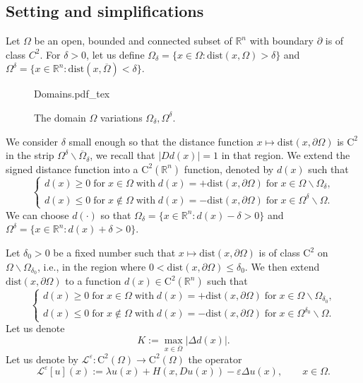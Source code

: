 \documentclass[11pt,reqno]{amsart}
\numberwithin{figure}{section}
\theoremstyle{plain}
\theoremstyle{remark}
\numberwithin{equation}{section}
\newcommand{\rmC}{\mathrm{C}}
\newcommand{\incfig}[1]{%
    \def\svgwidth{\columnwidth}
    {#1.pdf_tex}
}
\begin{document}
\subsection{Setting and simplifications} Let $\Omega$ be an open, bounded and connected subset of $\mathbb{R}^n$ with boundary $\partial$ is of class $C^2$. For $\delta>0$, let us define $\Omega_\delta = \{x\in \Omega: \mathrm{dist}(x,\Omega) > \delta\}$ and $\Omega^\delta = \{x\in \mathbb{R}^n: \mathrm{dist}(x,\overline{\Omega}) < \delta\}$. 
\begin{figure}[ht]
    \centering
    \def\svgwidth{0.47\columnwidth}
    {Domains.pdf_tex}
    \caption{The domain $\Omega$ variations $\Omega_\delta, \Omega^\delta$.}
    \label{fig:Domains}
\end{figure}
We consider $\delta$ small enough so that the distance function $x\mapsto \mathrm{dist}(x,\partial \Omega)$ is $\mathrm{C}^2$ in the strip $\Omega^\delta\backslash \overline{\Omega}_\delta$, we recall that $|D d(x)| = 1$ in that region. We extend the signed distance function into a $\mathrm{C}^2(\mathbb{R}^n)$ function, denoted by $d(x)$ such that 
\begin{equation*}
    \begin{cases}
    d(x)\geq 0\;\text{for}\;x\in\Omega\;\text{with}\;d(x) = +\mathrm{dist}(x,\partial\Omega)\;\text{for}\;x\in \Omega\backslash \Omega_\delta,\\
    d(x)\leq 0\;\text{for}\;x\notin \Omega\;\text{with}\;d(x) = -\mathrm{dist}(x,\partial\Omega)\;\text{for}\;x\in \Omega^\delta\backslash \Omega.
    \end{cases}
\end{equation*}
We can choose $d(\cdot)$ so that $\Omega_\delta = \{x\in \mathbb{R}^n: d(x)-\delta >0 \}$ and $\Omega^\delta = \{x\in \mathbb{R}^n: d(x) +\delta>0\}$.


Let $\delta_0>0$ be a fixed number such that $x\mapsto \mathrm{dist}(x,\partial\Omega)$ is of class $\mathrm{C}^2$ on $\Omega\backslash \Omega_{\delta_0}$, i.e., in the region where $0<\mathrm{dist}(x,\partial\Omega) \leq \delta_0$. We then extend $\mathrm{dist}(x,\partial\Omega)$ to a function $d(x)\in \mathrm{C}^2(\mathbb{R}^n)$ such that 
\begin{equation*}
    \begin{cases}
    d(x)\geq 0\;\text{for}\;x\in\Omega\;\text{with}\;d(x) = +\mathrm{dist}(x,\partial\Omega)\;\text{for}\;x\in \Omega\backslash \Omega_{\delta_0},\\
    d(x)\leq 0\;\text{for}\;x\notin \Omega\;\text{with}\;d(x) = -\mathrm{dist}(x,\partial\Omega)\;\text{for}\;x\in \Omega^{\delta_0}\backslash \Omega.
    \end{cases}
\end{equation*}
Let us denote
\begin{equation*}
    K := \max_{x\in \overline{\Omega}} |\Delta d(x)|.
\end{equation*}
\noindent Let us denote by $\mathcal{L}^\varepsilon:\rmC^2(\Omega)\to \rmC^2(\Omega)$ the operator
\begin{equation*}
    \mathcal{L}^\varepsilon[u](x) := \lambda u(x) + H(x,Du(x)) - \varepsilon \Delta u(x), \qquad x\in \Omega.
\end{equation*}
\end{document}
